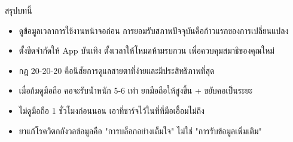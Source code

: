 \begin{tcbsummary}{สรุปบทนี้}
\begin{itemize}
  \item ดูข้อมูลเวลาการใช้งานหน้าจอก่อน การยอมรับสภาพปัจจุบันคือก้าวแรกของการเปลี่ยนแปลง
  \item ตั้งขีดจำกัดให้ App บันเทิง ตั้งเวลาให้โหมดห้ามรบกวน เพื่อควบคุมสมาธิของคุณใหม่
  \item กฎ 20-20-20 คือนิสัยการดูแลสายตาที่ง่ายและมีประสิทธิภาพที่สุด
  \item เมื่อก้มดูมือถือ คอจะรับน้ำหนัก 5-6 เท่า ยกมือถือให้สูงขึ้น + ขยับคอเป็นระยะ
  \item ไม่ดูมือถือ 1 ชั่วโมงก่อนนอน เอาที่ชาร์จไว้ในที่ที่มือเอื้อมไม่ถึง
  \item ยาแก้โรควิตกกังวลข้อมูลคือ "การบล็อกอย่างเต็มใจ" ไม่ใช่ "การรับข้อมูลเพิ่มเติม"
\end{itemize}

\end{tcbsummary}
